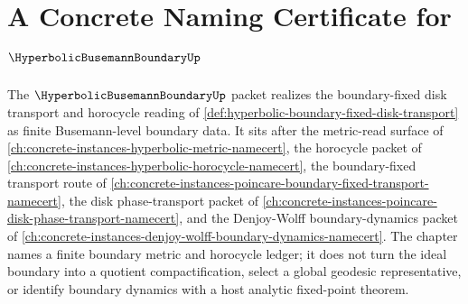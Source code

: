 \chapter{A Concrete Naming Certificate for $\HyperbolicBusemannBoundaryUp$}
\label{ch:concrete-instances-hyperbolic-busemann-boundary-namecert}

The $\HyperbolicBusemannBoundaryUp$ packet realizes the boundary-fixed disk transport and horocycle reading of \autoref{def:hyperbolic-boundary-fixed-disk-transport} as finite Busemann-level boundary data. It sits after the metric-read surface of \autoref{ch:concrete-instances-hyperbolic-metric-namecert}, the horocycle packet of \autoref{ch:concrete-instances-hyperbolic-horocycle-namecert}, the boundary-fixed transport route of \autoref{ch:concrete-instances-poincare-boundary-fixed-transport-namecert}, the disk phase-transport packet of \autoref{ch:concrete-instances-poincare-disk-phase-transport-namecert}, and the Denjoy-Wolff boundary-dynamics packet of \autoref{ch:concrete-instances-denjoy-wolff-boundary-dynamics-namecert}. The chapter names a finite boundary metric and horocycle ledger; it does not turn the ideal boundary into a quotient compactification, select a global geodesic representative, or identify boundary dynamics with a host analytic fixed-point theorem.

